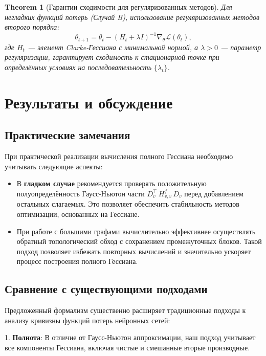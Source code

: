 \documentclass[11pt]{article}
\newtheorem{theorem}{Theorem}
\begin{document}
\begin{theorem}[Гарантии сходимости для регуляризованных методов]
  Для негладких функций потерь (Случай B), использование регуляризованных методов второго порядка:
  \[
    \theta_{t+1} = \theta_t - (H_t + \lambda I)^{-1} \nabla_\theta \mathcal{L}(\theta_t),
  \]
  где $H_t$ — элемент Clarke-Гессиана с минимальной нормой, а $\lambda > 0$ — параметр регуляризации,
  гарантирует сходимость к стационарной точке при определённых условиях на последовательность $\{\lambda_t\}$.
\end{theorem}

\section{Результаты и обсуждение}

\subsection{Практические замечания}

При практической реализации вычисления полного Гессиана необходимо учитывать следующие аспекты:

\begin{itemize}
  \item В \textbf{гладком случае} рекомендуется проверять положительную полуопределённость Гаусс-Ньютон части
    $D_v^\top\,H^f_{v,v}\,D_v$ перед добавлением остальных слагаемых. Это позволяет обеспечить стабильность
    методов оптимизации, основанных на Гессиане.

  \item При работе с большими графами вычислительно эффективнее осуществлять обратный топологический обход с
    сохранением промежуточных блоков. Такой подход позволяет избежать повторных вычислений и значительно
    ускоряет процесс построения полного Гессиана.
\end{itemize}

\subsection{Сравнение с существующими подходами}

Предложенный формализм существенно расширяет традиционные подходы к анализу кривизны функций потерь нейронных сетей:

1. \textbf{Полнота}: В отличие от Гаусс-Ньютон аппроксимации, наш подход учитывает все компоненты Гессиана,
включая чистые и смешанные вторые производные.
\end{document}
